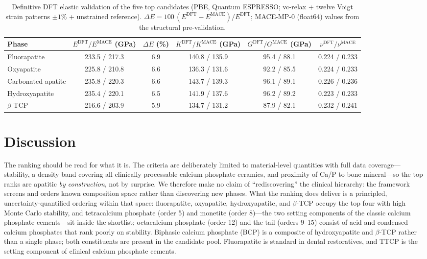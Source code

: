 \documentclass[11pt,a4paper]{article}
\begin{document}
\begin{table}[ht]
\centering\small
\caption{Definitive DFT elastic validation of the five top candidates (PBE, Quantum ESPRESSO; vc-relax + twelve Voigt strain patterns $\pm1\%$ + unstrained reference). $\Delta E=100\,(E^{\mathrm{DFT}}-E^{\mathrm{MACE}})/E^{\mathrm{DFT}}$; MACE-MP-0 (float64) values from the structural pre-validation.}
\label{tab:dft_elastik}
\begin{tabular}{lccccc}
\toprule
Phase & $E^{\mathrm{DFT}}/E^{\mathrm{MACE}}$ (GPa) & $\Delta E$ (\%) & $K^{\mathrm{DFT}}/K^{\mathrm{MACE}}$ (GPa) & $G^{\mathrm{DFT}}/G^{\mathrm{MACE}}$ (GPa) & $\nu^{\mathrm{DFT}}/\nu^{\mathrm{MACE}}$ \\
\midrule
Fluorapatite & 233.5 / 217.3 & 6.9 & 140.8 / 135.9 & 95.4 / 88.1 & 0.224 / 0.233 \\
Oxyapatite & 225.8 / 210.8 & 6.6 & 136.3 / 131.6 & 92.2 / 85.5 & 0.224 / 0.233 \\
Carbonated apatite & 235.8 / 220.3 & 6.6 & 143.7 / 139.3 & 96.1 / 89.1 & 0.226 / 0.236 \\
Hydroxyapatite & 235.4 / 220.1 & 6.5 & 141.9 / 137.6 & 96.2 / 89.2 & 0.223 / 0.233 \\
$\beta$-TCP & 216.6 / 203.9 & 5.9 & 134.7 / 131.2 & 87.9 / 82.1 & 0.232 / 0.241 \\
\bottomrule
\end{tabular}
\end{table}


\section{Discussion}\label{sec:diskusi}

The ranking should be read for what it is. The criteria are deliberately limited to material-level quantities with full data coverage---stability, a density band covering all clinically processable calcium phosphate ceramics, and proximity of Ca/P to bone mineral---so the top ranks are apatitic \emph{by construction}, not by surprise. We therefore make no claim of ``rediscovering'' the clinical hierarchy: the framework screens and orders known composition space rather than discovering new phases. What the ranking does deliver is a principled, uncertainty-quantified ordering within that space: fluorapatite, oxyapatite, hydroxyapatite, and $\beta$-TCP occupy the top four with high Monte Carlo stability, and tetracalcium phosphate (order 5) and monetite (order 8)---the two setting components of the classic calcium phosphate cements---sit inside the shortlist; octacalcium phosphate (order 12) and the tail (orders 9--15) consist of acid and condensed calcium phosphates that rank poorly on stability. Biphasic calcium phosphate (BCP) is a composite of hydroxyapatite and $\beta$-TCP rather than a single phase; both constituents are present in the candidate pool. Fluorapatite is standard in dental restoratives, and TTCP is the setting component of clinical calcium phosphate cements.
\end{document}
